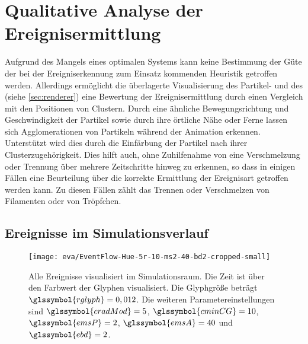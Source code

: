 \section{Qualitative Analyse der Ereignisermittlung}\label{sec:eva:ereignisse}
Aufgrund des Mangels eines optimalen Systems kann keine Bestimmung der Güte der bei der Ereigniserkennung zum Einsatz kommenden Heuristik getroffen werden. Allerdings ermöglicht die überlagerte Visualisierung des Partikel- und des  (siehe \autoref{sec:renderer}) eine Bewertung der Ereignisermittlung durch einen Vergleich mit den Positionen von Clustern. Durch eine ähnliche Bewegungsrichtung und Geschwindigkeit der Partikel sowie durch ihre örtliche Nähe oder Ferne lassen sich Agglomerationen von Partikeln während der Animation erkennen. Unterstützt wird dies durch die Einfärbung der Partikel nach ihrer Clusterzugehörigkeit. Dies hilft auch, ohne Zuhilfenahme von  eine Verschmelzung oder Trennung über mehrere Zeitschritte hinweg zu erkennen, so dass in einigen Fällen eine Beurteilung über die korrekte Ermittlung der Ereignisart getroffen werden kann. Zu diesen Fällen zählt das Trennen oder Verschmelzen von Filamenten oder von Tröpfchen.

\subsection*{Ereignisse im Simulationsverlauf}\label{sec:eva:ereignisse-quali-verlauf}

\begin{figure}
	\texttt{[image: eva/EventFlow-Hue-5r-10-ms2-40-bd2-cropped-small]}
	\caption{Alle Ereignisse visualisiert im Simulationsraum. Die Zeit ist über den Farbwert der Glyphen visualisiert. Die Glyphgröße  beträgt $\glssymbol{rglyph} = 0,012$. Die weiteren Parametereinstellungen sind $\glssymbol{cradMod} = 5$, $\glssymbol{cminCG} = 10$,  $\glssymbol{emsP} = 2$,  $\glssymbol{emsA} = 40$ und $\glssymbol{ebd} = 2$.}\label{fig:eva:EventFlow-Hue-5r-10-ms2-40-bd2-cropped-small}
\end{figure}

